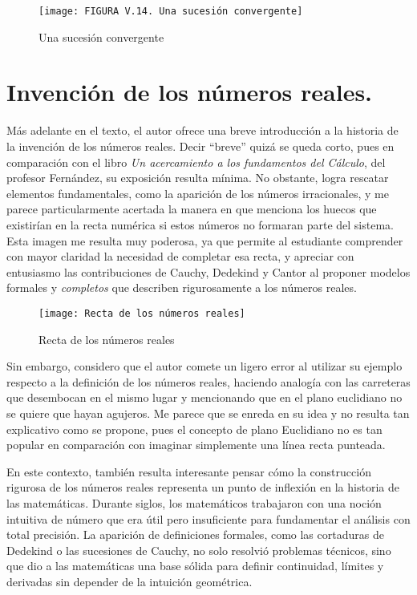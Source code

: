 \documentclass[a4paper,10pt]{article}
\begin{document}
\begin{figure}[h]
    \centering
    \texttt{[image: FIGURA V.14. Una sucesión convergente]}
    \caption{Una sucesión convergente}
    \label{fig:sucesion_convergente}
\end{figure}

\section*{Invención de los números reales.}

Más adelante en el texto, el autor ofrece una breve introducción a la historia de la invención de los números reales. Decir “breve” quizá se queda corto, pues en comparación con el libro \textit{Un acercamiento a los fundamentos del Cálculo}, del profesor Fernández, su exposición resulta mínima. No obstante, logra rescatar elementos fundamentales, como la aparición de los números irracionales, y me parece particularmente acertada la manera en que menciona los huecos que existirían en la recta numérica si estos números no formaran parte del sistema. Esta imagen me resulta muy poderosa, ya que permite al estudiante comprender con mayor claridad la necesidad de completar esa recta, y apreciar con entusiasmo las contribuciones de Cauchy, Dedekind y Cantor al proponer modelos formales y \textit{completos} que describen rigurosamente a los números reales.

\begin{figure}[h]
    \centering
    \texttt{[image: Recta de los números reales]}
    \caption{Recta de los números reales}
    \label{fig:recta_reales}
\end{figure}

Sin embargo, considero que el autor comete un ligero error al utilizar su ejemplo respecto a la definición de los números reales, haciendo analogía con las carreteras que desembocan en el mismo lugar y mencionando que en el plano euclidiano no se quiere que hayan agujeros. Me parece que se enreda en su idea y no resulta tan explicativo como se propone, pues el concepto de plano Euclidiano no es tan popular en comparación con imaginar simplemente una línea recta punteada. 

En este contexto, también resulta interesante pensar cómo la construcción rigurosa de los números reales representa un punto de inflexión en la historia de las matemáticas. Durante siglos, los matemáticos trabajaron con una noción intuitiva de número que era útil pero insuficiente para fundamentar el análisis con total precisión. La aparición de definiciones formales, como las cortaduras de Dedekind o las sucesiones de Cauchy, no solo resolvió problemas técnicos, sino que dio a las matemáticas una base sólida para definir continuidad, límites y derivadas sin depender de la intuición geométrica.
\end{document}
